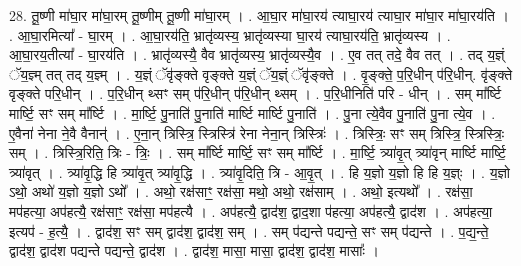 \documentclass[17pt]{extarticle}
\begin{document}
28. तू॒ष्णी मा॑घा॒र मा॑घा॒रम् तू॒ष्णीम् तू॒ष्णी मा॑घा॒रम् । . आ॒घा॒र मा॑घा॒रय॑ त्याघा॒रय॑ त्याघा॒र मा॑घा॒र मा॑घा॒रय॑ति । . आ॒घा॒रमित्या᳚ - घा॒रम् । . आ॒घा॒रय॑ति॒ भ्रातृ॑व्यस्य॒ भ्रातृ॑व्यस्या घा॒रय॑ त्याघा॒रय॑ति॒ भ्रातृ॑व्यस्य । . आ॒घा॒रय॒तीत्या᳚ - घा॒रय॑ति । . भ्रातृ॑व्यस्यै॒ वैव भ्रातृ॑व्यस्य॒ भ्रातृ॑व्यस्यै॒व । . ए॒व तत् तदे॒ वैव तत् । . तद् य॒ज्ञ्ं ॅय॒ज्ञ्म् तत् तद् य॒ज्ञ्म् । . य॒ज्ञ्ं ॅवृ॑ङ्क्ते वृङ्क्ते य॒ज्ञ्ं ॅय॒ज्ञ्ं ॅवृ॑ङ्क्ते । . वृ॒ङ्क्ते॒ प॒रि॒धीन् प॑रि॒धीन्. वृ॑ङ्क्ते वृङ्क्ते परि॒धीन् । . प॒रि॒धीन् थ्सꣳ सम् प॑रि॒धीन् प॑रि॒धीन् थ्सम् । . प॒रि॒धीनिति॑ परि - धीन् । . सम् मा᳚र्ष्टि मार्ष्टि॒ सꣳ सम् मा᳚र्ष्टि । . मा॒र्ष्टि॒ पु॒नाति॑ पु॒नाति॑ मार्ष्टि मार्ष्टि पु॒नाति॑ । . पु॒ना त्ये॒वैव पु॒नाति॑ पु॒ना त्ये॒व । . ए॒वैना॑ नेना ने॒वै वैनान्॑ । . ए॒ना॒न् त्रिस्त्रि॒ स्त्रिस्त्रि॑ रेना नेना॒न् त्रिस्त्रिः॑ । . त्रिस्त्रिः॒ सꣳ सम् त्रिस्त्रि॒ स्त्रिस्त्रिः॒ सम् । . त्रिस्त्रि॒रिति॒ त्रिः - त्रिः॒ । . सम् मा᳚र्ष्टि मार्ष्टि॒ सꣳ सम् मा᳚र्ष्टि । . मा॒र्ष्टि॒ त्र्या॑वृ॒त् त्र्या॑वृन् मार्ष्टि मार्ष्टि॒ त्र्या॑वृत् । . त्र्या॑वृ॒द्धि हि त्र्या॑वृ॒त् त्र्या॑वृ॒द्धि । . त्र्या॑वृ॒दिति॒ त्रि - आ॒वृ॒त् । . हि य॒ज्ञो य॒ज्ञो हि हि य॒ज्ञ्ः । . य॒ज्ञो ऽथो॒ अथो॑ य॒ज्ञो य॒ज्ञो ऽथो᳚ । . अथो॒ रक्ष॑साꣳ॒॒ रक्ष॑सा॒ मथो॒ अथो॒ रक्ष॑साम् । . अथो॒ इत्यथो᳚ । . रक्ष॑सा॒ मप॑हत्या॒ अप॑हत्यै॒ रक्ष॑साꣳ॒॒ रक्ष॑सा॒ मप॑हत्यै । . अप॑हत्यै॒ द्वाद॑श॒ द्वाद॒शा प॑हत्या॒ अप॑हत्यै॒ द्वाद॑श । . अप॑हत्या॒ इत्यप॑ - ह॒त्यै॒ । . द्वाद॑श॒ सꣳ सम् द्वाद॑श॒ द्वाद॑श॒ सम् । . सम् प॑द्यन्ते पद्यन्ते॒ सꣳ सम् प॑द्यन्ते । . प॒द्य॒न्ते॒ द्वाद॑श॒ द्वाद॑श पद्यन्ते पद्यन्ते॒ द्वाद॑श । . द्वाद॑श॒ मासा॒ मासा॒ द्वाद॑श॒ द्वाद॑श॒ मासाः᳚ । \newline
\end{document}
